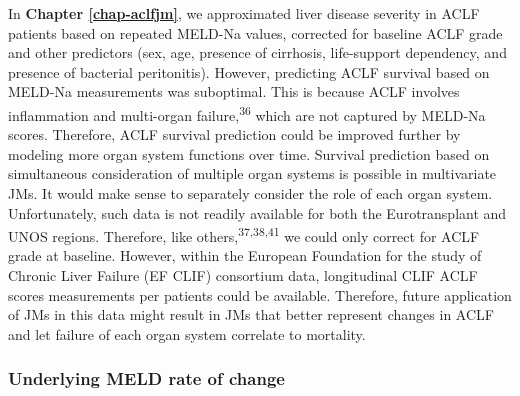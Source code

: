 \documentclass[11pt,english,]{book} %
\begin{document}
In \textbf{Chapter \ref{chap-aclfjm}}, we approximated liver disease severity in ACLF patients based on repeated MELD-Na values, corrected for baseline ACLF grade and other predictors (sex, age, presence of cirrhosis, life-support dependency, and presence of bacterial peritonitis). However, predicting ACLF survival based on MELD-Na measurements was suboptimal. This is because ACLF involves inflammation and multi-organ failure,\textsuperscript{36} which are not captured by MELD-Na scores. Therefore, ACLF survival prediction could be improved further by modeling more organ system functions over time. Survival prediction based on simultaneous consideration of multiple organ systems is possible in multivariate JMs. It would make sense to separately consider the role of each organ system. Unfortunately, such data is not readily available for both the Eurotransplant and UNOS regions. Therefore, like others,\textsuperscript{37,38,41} we could only correct for ACLF grade at baseline. However, within the European Foundation for the study of Chronic Liver Failure (EF CLIF) consortium data, longitudinal CLIF ACLF scores measurements per patients could be available. Therefore, future application of JMs in this data might result in JMs that better represent changes in ACLF and let failure of each organ system correlate to mortality.

\hypertarget{underlying-meld-rate-of-change}{%
\subsubsection*{Underlying MELD rate of change}\label{underlying-meld-rate-of-change}}
\end{document}
